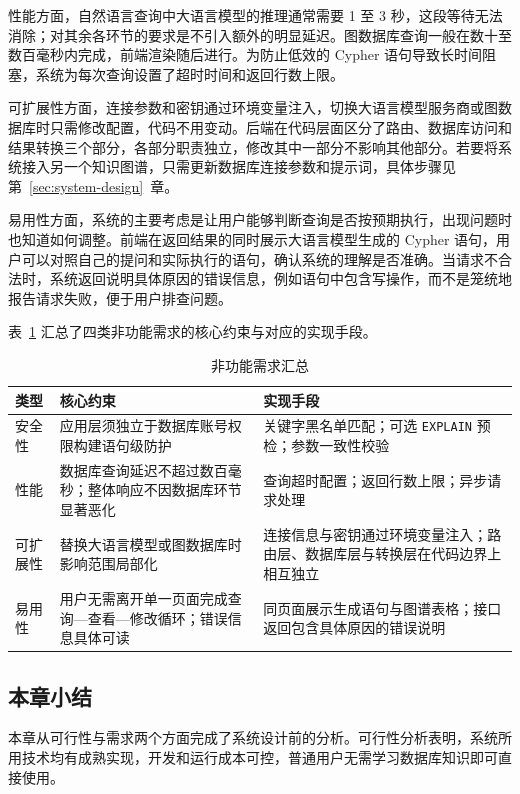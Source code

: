 \documentclass[12pt,a4paper]{article}
\begin{document}
性能方面，自然语言查询中大语言模型的推理通常需要 1 至 3 秒，这段等待无法消除；对其余各环节的要求是不引入额外的明显延迟。图数据库查询一般在数十至数百毫秒内完成，前端渲染随后进行。为防止低效的 Cypher 语句导致长时间阻塞，系统为每次查询设置了超时时间和返回行数上限。

可扩展性方面，连接参数和密钥通过环境变量注入，切换大语言模型服务商或图数据库时只需修改配置，代码不用变动。后端在代码层面区分了路由、数据库访问和结果转换三个部分，各部分职责独立，修改其中一部分不影响其他部分。若要将系统接入另一个知识图谱，只需更新数据库连接参数和提示词，具体步骤见第~\ref{sec:system-design}~章。

易用性方面，系统的主要考虑是让用户能够判断查询是否按预期执行，出现问题时也知道如何调整。前端在返回结果的同时展示大语言模型生成的 Cypher 语句，用户可以对照自己的提问和实际执行的语句，确认系统的理解是否准确。当请求不合法时，系统返回说明具体原因的错误信息，例如语句中包含写操作，而不是笼统地报告请求失败，便于用户排查问题。

表~\ref{tab:nfr-summary} 汇总了四类非功能需求的核心约束与对应的实现手段。

\begin{table}[H]
    \centering
    \caption{非功能需求汇总}
    \label{tab:nfr-summary}
    \small
    \begin{tabular}{p{1.6cm}p{4.8cm}p{5.0cm}}
        \toprule
        \textbf{类型} & \textbf{核心约束} & \textbf{实现手段} \\
        \midrule
        安全性 & 应用层须独立于数据库账号权限构建语句级防护 & 关键字黑名单匹配；可选 \texttt{EXPLAIN} 预检；参数一致性校验 \\
        性能 & 数据库查询延迟不超过数百毫秒；整体响应不因数据库环节显著恶化 & 查询超时配置；返回行数上限；异步请求处理 \\
        可扩展性 & 替换大语言模型或图数据库时影响范围局部化 & 连接信息与密钥通过环境变量注入；路由层、数据库层与转换层在代码边界上相互独立 \\
        易用性 & 用户无需离开单一页面完成查询—查看—修改循环；错误信息具体可读 & 同页面展示生成语句与图谱表格；接口返回包含具体原因的错误说明 \\
        \bottomrule
    \end{tabular}
\end{table}

\subsection{本章小结}

本章从可行性与需求两个方面完成了系统设计前的分析。可行性分析表明，系统所用技术均有成熟实现，开发和运行成本可控，普通用户无需学习数据库知识即可直接使用。
\end{document}
